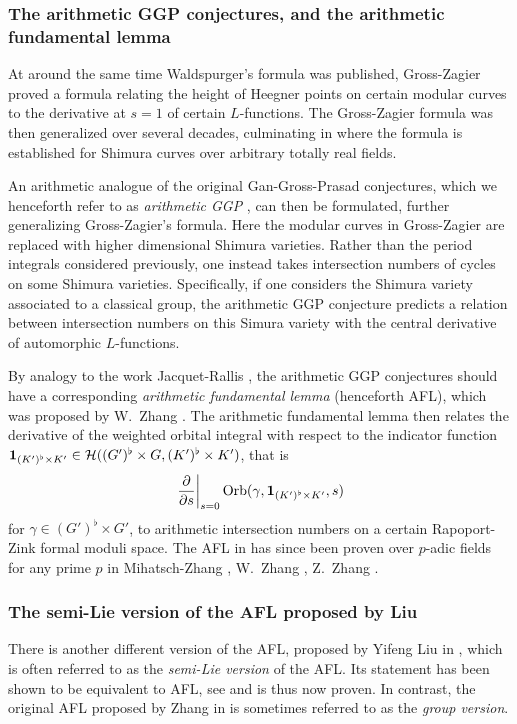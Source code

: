 \subsubsection{The arithmetic GGP conjectures, and the arithmetic fundamental lemma}
At around the same time Waldspurger's formula was published,
Gross-Zagier \cite{ref:gross_zagier} proved a formula
relating the height of Heegner points
on certain modular curves to the derivative at $s=1$ of certain $L$-functions.
The Gross-Zagier formula was then generalized over several decades,
culminating in \cite{ref:GZshimura} where the formula is established
for Shimura curves over arbitrary totally real fields.

An arithmetic analogue of the original Gan-Gross-Prasad conjectures,
which we henceforth refer to as \emph{arithmetic GGP} \cite{ref:GGP},
can then be formulated, further generalizing Gross-Zagier's formula.
Here the modular curves in Gross-Zagier
are replaced with higher dimensional Shimura varieties.
Rather than the period integrals considered previously,
one instead takes intersection numbers of cycles on some Shimura varieties.
Specifically, if one considers the Shimura variety associated to a classical group,
the arithmetic GGP conjecture predicts a relation between intersection numbers
on this Simura variety with the central derivative of automorphic $L$-functions.

By analogy to the work Jacquet-Rallis \cite{ref:JR},
the arithmetic GGP conjectures should have a corresponding
\emph{arithmetic fundamental lemma} (henceforth AFL),
which was proposed by W.\ Zhang \cite[Conjecture 2.9]{ref:AFL}.
The arithmetic fundamental lemma then relates the derivative
of the weighted orbital integral with respect to the indicator function
$\mathbf{1}_{(K')^\flat \times K'} \in \mathcal H((G')^\flat \times G, (K')^\flat \times K')$, that is
\[ \left. \pdv{}{s} \right\rvert_{s=0} \operatorname{Orb}(\gamma, \mathbf{1}_{(K')^\flat \times K'}, s) \]
for $\gamma \in (G')^\flat \times G'$,
to arithmetic intersection numbers on a certain Rapoport-Zink formal moduli space.
The AFL in \cite{ref:AFL} has since been proven over $p$-adic fields for any prime $p$ in
Mihatsch-Zhang \cite{ref:MZ2021}, W.\ Zhang \cite{ref:Wei2021}, Z.\ Zhang \cite{ref:Zhiyu}.

\subsubsection{The semi-Lie version of the AFL proposed by Liu}
There is another different version of the AFL, proposed by Yifeng Liu in
\cite[Conjecture 1.12]{ref:liuFJ},
which is often referred to as the \emph{semi-Lie version} of the AFL.
Its statement has been shown to be equivalent to AFL,
see \cite[Remark 1.13]{ref:liuFJ} and is thus now proven.
In contrast, the original AFL proposed by Zhang in \cite[Conjecture 2.9]{ref:AFL}
is sometimes referred to as the \emph{group version}.


